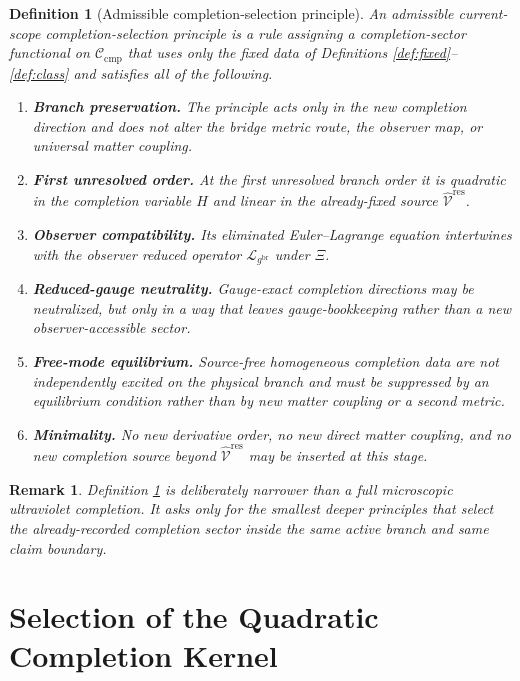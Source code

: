 \documentclass[11pt]{article}
\newcommand{\ObserverMap}{\Xi}
\newcommand{\ObserverMetric}{g^{\mathrm{br}}}
\newcommand{\ResidualLift}{\widehat{\mathcal V}^{\mathrm{res}}}
\newcommand{\ReducedEin}{\mathcal L_{\ObserverMetric}}
\newcommand{\CompClass}{\mathscr C_{\mathrm{cmp}}}
\newtheorem{definition}{Definition}
\newtheorem{remark}{Remark}
\begin{document}
\begin{definition}[Admissible completion-selection principle]
\label{def:principle}
An \emph{admissible current-scope completion-selection principle} is a rule assigning a completion-sector functional on \(\CompClass\) that uses only the fixed data of Definitions \ref{def:fixed}--\ref{def:class} and satisfies all of the following.
\begin{enumerate}
    \item \textbf{Branch preservation.} The principle acts only in the new completion direction and does not alter the bridge metric route, the observer map, or universal matter coupling.
    \item \textbf{First unresolved order.} At the first unresolved branch order it is quadratic in the completion variable \(H\) and linear in the already-fixed source \(\ResidualLift\).
    \item \textbf{Observer compatibility.} Its eliminated Euler--Lagrange equation intertwines with the observer reduced operator \(\ReducedEin\) under \(\ObserverMap\).
    \item \textbf{Reduced-gauge neutrality.} Gauge-exact completion directions may be neutralized, but only in a way that leaves gauge-bookkeeping rather than a new observer-accessible sector.
    \item \textbf{Free-mode equilibrium.} Source-free homogeneous completion data are not independently excited on the physical branch and must be suppressed by an equilibrium condition rather than by new matter coupling or a second metric.
    \item \textbf{Minimality.} No new derivative order, no new direct matter coupling, and no new completion source beyond \(\ResidualLift\) may be inserted at this stage.
\end{enumerate}
\end{definition}

\begin{remark}
Definition \ref{def:principle} is deliberately narrower than a full microscopic ultraviolet completion. It asks only for the smallest deeper principles that select the already-recorded completion sector inside the same active branch and same claim boundary.
\end{remark}

\section{Selection of the Quadratic Completion Kernel}
\end{document}
